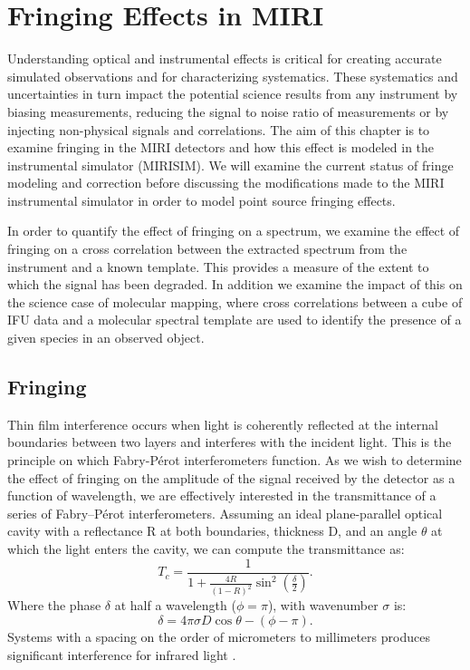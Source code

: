 \chapter{Fringing Effects in MIRI}\label{ch:fringe}
Understanding optical and instrumental effects is critical for creating accurate simulated observations and for characterizing systematics. 
These systematics and uncertainties in turn impact the potential science results from any instrument by biasing measurements, reducing the signal to noise ratio of measurements or by injecting non-physical signals and correlations.
The aim of this chapter is to examine fringing in the MIRI detectors and how this effect is modeled in the instrumental simulator (MIRISIM). 
We will examine the current status of fringe modeling and correction before discussing the modifications made to the MIRI instrumental simulator in order to model point source fringing effects.

In order to quantify the effect of fringing on a spectrum, we examine the effect of fringing on a cross correlation between the extracted spectrum from the instrument and a known template. 
This provides a measure of the extent to which the signal has been degraded.
In addition we examine the impact of this on the science case of molecular mapping, where cross correlations between a cube of IFU data and a molecular spectral template are used to identify the presence of a given species in an observed object. 

\section{Fringing}
Thin film interference occurs when light is coherently reflected at the internal boundaries between two layers and interferes with the incident light.
This is the principle on which Fabry-P\'{e}rot interferometers function.
As we wish to determine the effect of fringing on the amplitude of the signal received by the detector as a function of wavelength, we are effectively interested in the transmittance of a series of Fabry--P\'{e}rot interferometers. 
Assuming an ideal plane-parallel optical cavity with a reflectance R at both boundaries, thickness D, and an angle $\theta$ at which the light enters the cavity, we can compute the transmittance as:
\begin{equation}\label{eqn:trans}
T_{c} = \frac{1}{1+\frac{4R}{\left(1-R\right)^{2}}\sin^{2}\left(\frac{\delta}{2}\right)}.
\end{equation}
Where the phase $\delta$ at half a wavelength ($\phi = \pi$), with wavenumber $\sigma$ is:
\begin{equation}\label{eqn:phase}
\delta = 4\pi\sigma D \cos\theta - (\phi - \pi).
\end{equation}
Systems with a spacing on the order of micrometers to millimeters produces significant interference for infrared light \parencite{Lahuis2003}.


